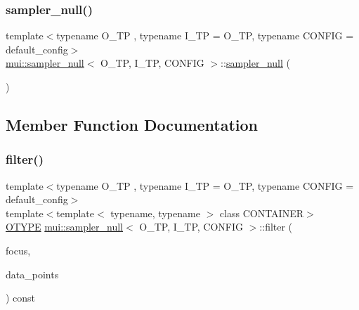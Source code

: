 \subsubsection{\texorpdfstring{sampler\+\_\+null()}{sampler\_null()}}
{\footnotesize\ttfamily template$<$typename O\+\_\+\+TP , typename I\+\_\+\+TP  = O\+\_\+\+TP, typename C\+O\+N\+F\+IG  = default\+\_\+config$>$ \\
\hyperlink{classmui_1_1sampler__null}{mui\+::sampler\+\_\+null}$<$ O\+\_\+\+TP, I\+\_\+\+TP, C\+O\+N\+F\+IG $>$\+::\hyperlink{classmui_1_1sampler__null}{sampler\+\_\+null} (\begin{DoxyParamCaption}{ }\end{DoxyParamCaption})\hspace{0.3cm}{\ttfamily [inline]}}



\subsection{Member Function Documentation}
\mbox{\label{classmui_1_1sampler__null_ade031d5c47cbf05f49e4e958da23f078}} 
\subsubsection{\texorpdfstring{filter()}{filter()}}
{\footnotesize\ttfamily template$<$typename O\+\_\+\+TP , typename I\+\_\+\+TP  = O\+\_\+\+TP, typename C\+O\+N\+F\+IG  = default\+\_\+config$>$ \\
template$<$template$<$ typename, typename $>$ class C\+O\+N\+T\+A\+I\+N\+ER$>$ \\
\hyperlink{classmui_1_1sampler__null_a6f20339fd4ce5f99e6800ab77558f9e9}{O\+T\+Y\+PE} \hyperlink{classmui_1_1sampler__null}{mui\+::sampler\+\_\+null}$<$ O\+\_\+\+TP, I\+\_\+\+TP, C\+O\+N\+F\+IG $>$\+::filter (\begin{DoxyParamCaption}\item[{\hyperlink{classmui_1_1sampler__null_a985eebd74be60f0c554d6ab50914e99b}{point\+\_\+type}}]{focus,  }\item[{const C\+O\+N\+T\+A\+I\+N\+ER$<$ \hyperlink{classmui_1_1sampler__null_a000a82d8a158f0188279e708c2625865}{I\+T\+Y\+PE}, C\+O\+N\+F\+IG $>$ \&}]{data\+\_\+points }\end{DoxyParamCaption}) const\hspace{0.3cm}{\ttfamily [inline]}}

